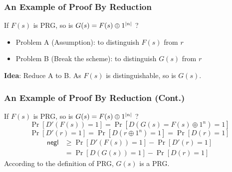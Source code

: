 \begin{frame}\frametitle{An Example of Proof By Reduction}
\begin{exampleblock}{If $F(s)$ is PRG, so is $G(s)=F(s)\oplus 1^{\lvert n\rvert}$ ?}
\begin{itemize}
\item Problem A (Assumption): to distinguish $F(s)$ from $r$
\item Problem B (Break the scheme): to distinguish $G(s)$ from $r$
\end{itemize}
\textbf{Idea}: Reduce A to B. As $F(s)$ is distinguishable, so is $G(s)$.
\begin{figure}
\begin{center}

\end{center}
\end{figure}
\end{exampleblock}
\end{frame}
\begin{frame}\frametitle{An Example of Proof By Reduction (Cont.)}
\begin{exampleblock}{If $F(s)$ is PRG, so is $G(s)=F(s)\oplus 1^{\lvert n\rvert}$ ?}
\[ \Pr[D'(F(s))=1]=\Pr[D(G(s)=F(s)\oplus 1^n)=1] \]
\[ \Pr[D'(r)=1]=\Pr[D(r\oplus 1^n)=1]=\Pr[D(r)=1] \]
\[ \begin{split}
\mathsf{negl} &\ge \Pr[D'(F(s))=1] - \Pr[D'(r)=1] \\
              &= \Pr[D(G(s))=1] - \Pr[D(r)=1]
\end{split} \]
According to the definition of PRG, $G(s)$ is a PRG.
\end{exampleblock}
\end{frame}
